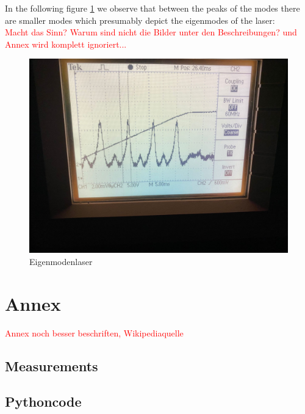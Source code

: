\documentclass{article}
\begin{document}
In the following figure \ref{Eigenmoden_laser} we observe that between the peaks of the modes there are smaller modes which presumably depict the eigenmodes of the laser:\\
\textcolor{red}{Macht das Sinn? Warum sind nicht die Bilder unter den Beschreibungen? und Annex wird komplett ignoriert...}
\begin{figure}
\includegraphics[width=\textwidth]{oszilloskopbild_mit_eigenmoden_vom_laser.jpg}
\caption{Eigenmodenlaser}
\label{Eigenmoden_laser}
\end{figure}

\section{Annex}

\textcolor{red}{Annex noch besser beschriften, Wikipediaquelle}

\subsection{Measurements}




\subsection{Pythoncode}



\end{document}
